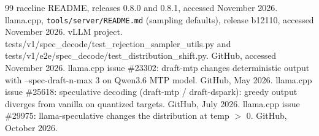\documentclass[10pt]{article}
\theoremstyle{remark}
\begin{document}
\begin{thebibliography}{99}
 raceline README, releases 0.8.0 and 0.8.1, accessed November 2026.
 llama.cpp, \texttt{tools/server/README.md} (sampling defaults), release b12110, accessed November 2026.
 vLLM project. tests/v1/spec\_decode/test\_rejection\_sampler\_utils.py and tests/v1/e2e/spec\_decode/test\_distribution\_shift.py. GitHub, accessed November 2026.
 llama.cpp issue \#23302: draft-mtp changes deterministic output with --spec-draft-n-max 3 on Qwen3.6 MTP model. GitHub, May 2026.
 llama.cpp issue \#25618: speculative decoding (draft-mtp / draft-dspark): greedy output diverges from vanilla on quantized targets. GitHub, July 2026.
 llama.cpp issue \#29975: llama-speculative changes the distribution at temp $>$ 0. GitHub, October 2026.
\end{thebibliography}
\end{document}
